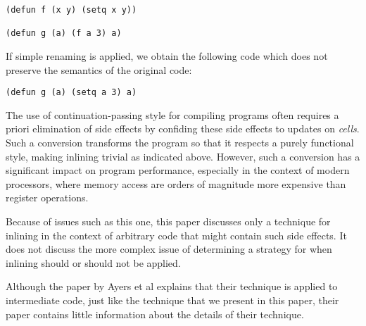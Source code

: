 \begin{verbatim}
(defun f (x y) (setq x y))

(defun g (a) (f a 3) a)
\end{verbatim}

If simple renaming is applied, we obtain the following code which does
not preserve the semantics of the original code:

\begin{verbatim}
(defun g (a) (setq a 3) a)
\end{verbatim}

\noindent
The use of continuation-passing style for compiling \commonlisp{}
programs often requires a priori elimination of side effects by
confiding these side effects to updates on \emph{cells}.  Such a
conversion transforms the program so that it respects a purely
functional style, making inlining trivial as indicated above.
However, such a conversion has a significant impact on program
performance, especially in the context of modern processors, where
memory access are orders of magnitude more expensive than register
operations.

Because of issues such as this one, this paper discusses only a
technique for inlining in the context of arbitrary \commonlisp{} code
that might contain such side effects.  It does not discuss the more
complex issue of determining a strategy for when inlining should or
should not be applied.

Although the paper by Ayers et al explains that their technique is
applied to intermediate code, just like the technique that we present
in this paper, their paper contains little information about the details
of their technique.

